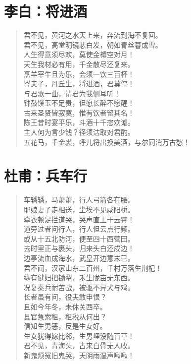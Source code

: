 \documentclass[12pt,oneside]{book}
\newenvironment{shici}{
\begin{verse}
\centering\large\hspace{12pt}}
{\end{verse}}
\begin{document}
\chapter{李白：将进酒}
\begin{shici}
君不见，黄河之水天上来，奔流到海不复回。\\
君不见，高堂明镜悲白发，朝如青丝暮成雪。\\
人生得意须尽欢，莫使金樽空对月！\\
天生我材必有用，千金散尽还复来。\\
烹羊宰牛且为乐，会须一饮三百杯！\\
岑夫子，丹丘生，将进酒，君莫停！\\
与君歌一曲，请君为我侧耳听！\\
钟鼓馔玉不足贵，但愿长醉不愿醒！\\
古来圣贤皆寂寞，惟有饮者留其名！\\
陈王昔时宴平乐，斗酒十千恣欢谑。\\
主人何为言少钱？径须沽取对君酌。\\
五花马，千金裘，呼儿将出换美酒，与尔同消万古愁！
\end{shici}

\chapter{杜甫：兵车行}
\begin{shici}
车辚辚，马萧萧，行人弓箭各在腰。\\
耶娘妻子走相送，尘埃不见咸阳桥。\\
牵衣顿足拦道哭，哭声直上干云霄！\\
道旁过者问行人，行人但云点行频。\\
或从十五北防河，便至四十西营田。\\
去时里正与裹头，归来头白还戍边！\\
边亭流血成海水，武皇开边意未已。\\
君不闻，汉家山东二百州，千村万落生荆杞！\\
纵有健妇把锄犁，禾生陇亩无东西。\\
况复秦兵耐苦战，被驱不异犬与鸡。\\
长者虽有问，役夫敢申恨？\\
且如今年冬，未休关西卒。\\
县官急索租，租税从何出？\\
信知生男恶，反是生女好。\\
生女犹得嫁比邻，生男埋没随百草！\\
君不见，青海头，古来白骨无人收。\\
新鬼烦冤旧鬼哭，天阴雨湿声啾啾！
\end{shici}
\end{document}
